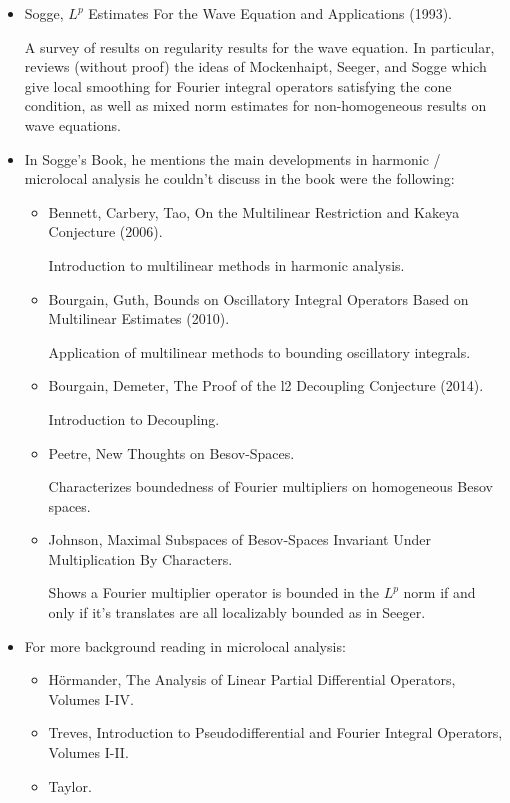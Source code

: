 \begin{itemize}
    \item Sogge, $L^p$ Estimates For the Wave Equation and Applications (1993).

    A survey of results on regularity results for the wave equation. In particular, reviews (without proof) the ideas of Mockenhaipt, Seeger, and Sogge which give local smoothing for Fourier integral operators satisfying the cone condition, as well as mixed norm estimates for non-homogeneous results on wave equations.

    \item In Sogge's Book, he mentions the main developments in harmonic / microlocal analysis he couldn't discuss in the book were the following:
    \begin{itemize}
        \item Bennett, Carbery, Tao, On the Multilinear Restriction and Kakeya Conjecture (2006).

        Introduction to multilinear methods in harmonic analysis.

        \item Bourgain, Guth, Bounds on Oscillatory Integral Operators Based on Multilinear Estimates (2010).

        Application of multilinear methods to bounding oscillatory integrals.

        \item Bourgain, Demeter, The Proof of the l2 Decoupling Conjecture (2014).

        Introduction to Decoupling.

        \item Peetre, New Thoughts on Besov-Spaces.

        Characterizes boundedness of Fourier multipliers on homogeneous Besov spaces.

        \item Johnson, Maximal Subspaces of Besov-Spaces Invariant Under Multiplication By Characters.

            Shows a Fourier multiplier operator is bounded in the $L^p$ norm if and only if it's translates are all localizably bounded as in Seeger.
    \end{itemize}

    \item For more background reading in microlocal analysis:
    \begin{itemize}
        \item H\"{o}rmander, The Analysis of Linear Partial Differential Operators, Volumes I-IV.
        \item Treves, Introduction to Pseudodifferential and Fourier Integral Operators, Volumes I-II.
        \item Taylor.
    \end{itemize}


\end{itemize}
